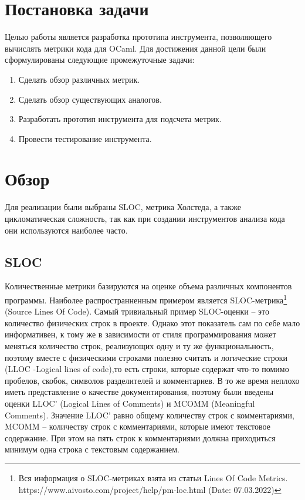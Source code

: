 \section{Постановка задачи}
Целью работы является разработка прототипа инструмента, позволяющего вычислять метрики кода для OCaml. Для достижения данной цели были сформулированы следующие промежуточные задачи:
\begin{enumerate}
    \item Сделать обзор различных метрик.
    \item Сделать обзор существующих аналогов.
    \item Разработать прототип инструмента для подсчета метрик.
    \item Провести тестирование инструмента.
\end{enumerate}
\section{Обзор}
Для реализации были выбраны SLOC, метрика
Холстеда, а также цикломатическая сложность, так как при 
создании инструментов анализа кода они используются наиболее часто.
\subsection{SLOC}
Количественные метрики базируются на оценке объема различных компонентов программы. Наиболее распространненным примером является SLOC-метрика\footnote{Вся информация о
SLOC-метриках взята из статьи Lines Of Code Metrics. https://www.aivosto.com/project/help/pm-loc.html (Date: 07.03.2022)} (Source Lines Of Code). Самый тривиальный пример SLOC-оценки -- это количество физических строк в проекте. Однако этот показатель сам по себе мало информативен, к тому же в зависимости от стиля программирования может меняться количество строк, реализующих одну и ту же функциональность, поэтому вместе с физическими строками полезно считать и логические строки (LLOC -Logical lines of code),то есть строки, которые содержат что-то помимо пробелов, скобок, символов разделителей и комментариев. В то же время неплохо иметь представление о качестве документирования, поэтому были введены оценки LLOC' (Logical Lines of Comments)
и MCOMM (Meaningful Comments). Значение LLOC' равно общему количеству строк с комментариями, MCOMM -- количеству строк с комментариями, которые имеют текстовое содержание. При этом на пять строк к комментариями должна приходиться минимум одна
строка с текстовым содержанием. 


